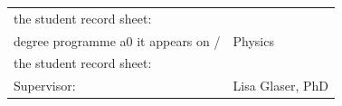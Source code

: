 \begin{titlepage}
\begin{center}
\begin{tabular}{p{9cm}p{11.25cm}}
        \fontsize{10}{0} \selectfont the student record sheet:\vspace*{0.4cm} &
        \fontsize{10}{0} \selectfont\\

        \fontsize{10}{0} \selectfont degree
        programme a0 it appears on / &  \fontsize{10}{0} \selectfont Physics \\

        \fontsize{10}{0} \selectfont the student record sheet:\vspace*{0.4cm} &
        \fontsize{10}{0} \selectfont \\

        \fontsize{10}{0} \selectfont
        Supervisor:\vspace*{0.4cm}& \fontsize{10}{0} \selectfont Lisa Glaser, PhD\\
\end{tabular}
\end{center}
\end{titlepage}
